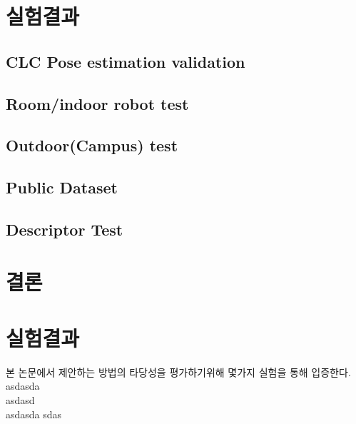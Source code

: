 \documentclass[master,korean,final]{cbnu-ecs}
\begin{document}
\chapter{실험결과}
\section{CLC Pose estimation validation}
\section{Room/indoor robot test}
\section{Outdoor(Campus) test}
\section{Public Dataset}
\section{Descriptor Test}
\chapter{결론}


\chapter{실험결과}

본 논문에서 제안하는 방법의 타당성을 평가하기위해 몇가지 실험을 통해 입증한다. \\
asdasda\\
asdasd\\
asdasda
sdas
\end{document}
